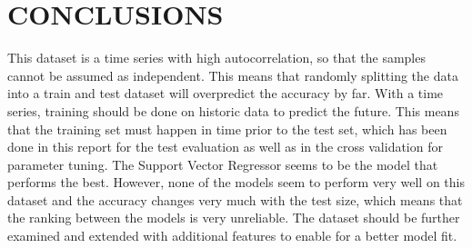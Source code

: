 \section*{CONCLUSIONS}\label{conclusions}
This dataset is a time series with high autocorrelation, so that the
samples cannot be assumed as independent. This means that randomly
splitting the data into a train and test dataset will overpredict the
accuracy by far. With a time series, training should be done on historic
data to predict the future. This means that the training set must happen
in time prior to the test set, which has been done in this report for
the test evaluation as well as in the cross validation for parameter
tuning.
The Support Vector Regressor seems to be the model that performs the
best. However, none of the models seem to perform very well on this
dataset and the accuracy changes very much with the test size, which
means that the ranking between the models is very unreliable. The
dataset should be further examined and extended with additional features
to enable for a better model fit.
